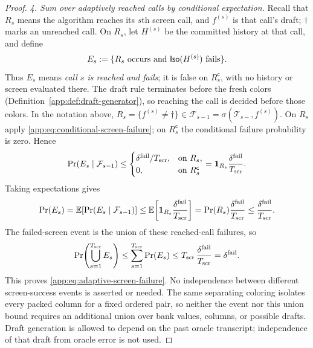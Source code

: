 \begin{proof}
\emph{4. Sum over adaptively reached calls by conditional expectation.}
Recall that $R_s$ means the algorithm reaches its $s$th screen call,
and $f^{(s)}$ is that call's draft; $\dagger$ marks an unreached call.
On $R_s$, let $H^{(s)}$ be the committed history at that call, and define
\hypertarget{app-reached-screen-failure}{}
\[
 E_s:=\{R_s\text{ occurs and }\mathsf{Iso}(H^{(s)})\text{ fails}\}.
\]
Thus $E_s$ means \emph{call $s$ is reached and fails}; it is false on
$R_s^{\mathsf c}$, with no history or screen evaluated there.
The draft rule terminates before the fresh colors
(Definition~\ref{app:def:draft-generator}), so reaching the call is
decided before those colors.  In the notation above,
$R_s=\{f^{(s)}\ne\dagger\}\in
\mathcal F_{s-1}=\sigma(\mathcal T_{s-},f^{(s)})$.
On $R_s$ apply \eqref{app:eq:conditional-screen-failure};
on $R_s^{\mathsf c}$ the conditional failure probability is zero.  Hence
\[
 \Pr(E_s\mid\mathcal F_{s-1})
 \le
 \begin{cases}
 \delta^{\mathrm{fail}}/T_{\mathrm{scr}},&\text{on }R_s,\\
 0,&\text{on }R_s^{\mathsf c}
 \end{cases}
 =\mathbf 1_{R_s}\frac{\delta^{\mathrm{fail}}}{T_{\mathrm{scr}}}.
\]
Taking expectations gives
\[
 \Pr(E_s)
 =\mathbb E\!\left[
   \Pr(E_s\mid\mathcal F_{s-1})
  \right]
 \le\mathbb E\!\left[
   \mathbf 1_{R_s}\frac{\delta^{\mathrm{fail}}}{T_{\mathrm{scr}}}
  \right]
 =\Pr(R_s)\frac{\delta^{\mathrm{fail}}}{T_{\mathrm{scr}}}
 \le\frac{\delta^{\mathrm{fail}}}{T_{\mathrm{scr}}}.
\]
The failed-screen event is the union of these reached-call failures, so
\[
 \Pr\!\left(\bigcup_{s=1}^{T_{\mathrm{scr}}}E_s\right)
 \le\sum_{s=1}^{T_{\mathrm{scr}}}\Pr(E_s)
 \le T_{\mathrm{scr}}\,
      \frac{\delta^{\mathrm{fail}}}{T_{\mathrm{scr}}}
 =\delta^{\mathrm{fail}}.
\]
This proves \eqref{app:eq:adaptive-screen-failure}.  No independence between
different screen-success events is asserted or needed.  The same separating coloring
isolates every packed column for a fixed ordered pair, so neither the event
nor this union bound requires an additional union over bank values, columns,
or possible drafts.  Draft generation is allowed to depend on the past
oracle transcript; independence of that draft from oracle error is not used.
\end{proof}

